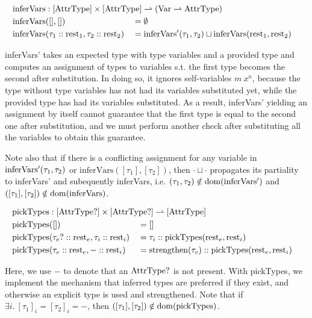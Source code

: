 \newcommand{\inferVars}{\mathrm{inferVars}}

\begin{alignat*}{3}
	\inferVars &: \mathrlap{[\AttrType] \times [\AttrType] \rightharpoonup (\Var \rightharpoonup \AttrType)} \\
	\inferVars&([], []) &&= \emptyset \\
	\inferVars&(\tau_1 :: \rest_1, \tau_2 :: \rest_2) &&= \inferVarsDash(\tau_1, \tau_2) \sqcup \inferVars(\rest_1, \rest_2) \\
\end{alignat*}

inferVars' takes an expected type with type variables and a provided type and computes an assignment of types to variables s.t. the first type becomes the second after substitution. In doing so, it ignores self-variables $m\ x^\kappa$, because the type without type variables has not had its variables substituted yet, while the provided type has had its variables substituted. As a result, inferVars' yielding an assignment by itself cannot guarantee that the first type is equal to the second one after substitution, and we must perform another check after substituting all the variables to obtain this guarantee. 

Note also that if there is a conflicting assignment for any variable in $\mathrm{inferVars'}(\tau_1, \tau_2)$ or $\inferVars([\tau_1], [\tau_2])$, then $\cdot \sqcup \cdot$ propagates its partiality to inferVars' and subequently inferVars, i.e. $(\tau_1, \tau_2) \notin \mathrm{dom}(\mathrm{inferVars'})$ and $([\tau_1], [\tau_2]) \notin \dom(\inferVars)$.

\newcommand{\pickTypes}{\mathrm{pickTypes}}

\begin{alignat*}{3}
	\pickTypes &: \mathrlap{[\AttrType?] \times [\AttrType?] \rightharpoonup [\AttrType]} \\
	\pickTypes&([]) &&= [] \\
	\pickTypes&(\tau_e? :: \rest_e, \tau_i :: \rest_i) &&= \tau_i :: \pickTypes(\rest_e, \rest_i) \\
	\pickTypes&(\tau_e :: \rest_e, - :: \rest_i) &&= \strengthen(\tau_e) :: \pickTypes(\rest_e, \rest_i) \\
\end{alignat*}

Here, we use $-$ to denote that an $\mathrm{AttrType}?$ is not present.
With pickTypes, we implement the mechanism that inferred types are preferred if they exist, and otherwise an explicit type is used and strengthened. Note that if $\exists i.\ [\tau_1]_i = [\tau_2]_i = -$, then $([\tau_1], [\tau_2]) \notin \dom(\pickTypes)$.

